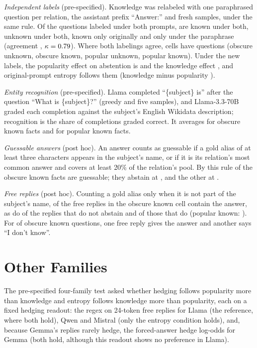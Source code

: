 \documentclass[manuscript,screen,review,anonymous,nonacm]{acmart}
\newcommand{\idk}{``I don't know''}
\begin{document}
\emph{Independent labels} (pre-specified). Knowledge was relabeled with one paraphrased question per relation, the assistant prefix ``Answer:'' and fresh samples, under the same rule. Of the \lcBothN{} questions labeled under both prompts, \lcKK{} are known under both, \lcUU{} unknown under both, \lcKU{} known only originally and \lcUK{} only under the paraphrase (agreement \lcAgree, $\kappa=0.79$). Where both labelings agree, cells have \lcConsN{} questions (obscure unknown, obscure known, popular unknown, popular known). Under the new labels, the popularity effect on abstention is \eoPop{} \eoPopCI{} and the knowledge effect \eoKnow{} \eoKnowCI, and original-prompt entropy follows them (knowledge minus popularity \eoEntKmP{} \eoEntKmPCI).

\emph{Entity recognition} (pre-specified). Llama completed ``\{subject\} is'' after the question ``What is \{subject\}?'' (greedy and five samples), and Llama-3.3-70B graded each completion against the subject's English Wikidata description; recognition is the share of completions graded correct. It averages \ekObsKnown{} for obscure known facts and \ekPopKnown{} for popular known facts.

\emph{Guessable answers} (post hoc). An answer counts as guessable if a gold alias of at least three characters appears in the subject's name, or if it is its relation's most common answer and covers at least 20\% of the relation's pool. By this rule \rcGuessN{} of the \gsObsKnownTotal{} obscure known facts are guessable; they abstain at \rcGuessAbs, and the other \rcNonGuessN{} at \rcNonGuessAbs.

\emph{Free replies} (post hoc). Counting a gold alias only when it is not part of the subject's name, \ecAll{} of the free replies in the obscure known cell contain the answer, as do \ecNonAbs{} of the replies that do not abstain and \ecAbs{} of those that do (popular known: \ecPopKnown). For \ecBoth{} of \ecBothOf{} obscure known questions, one free reply gives the answer and another says \idk.

\section{Other Families}
\label{app:families}

The pre-specified four-family test asked whether hedging follows popularity more than knowledge and entropy follows knowledge more than popularity, each on a fixed hedging readout: the regex on 24-token free replies for Llama (the reference, where both hold), Qwen and Mistral (only the entropy condition holds), and, because Gemma's replies rarely hedge, the forced-answer hedge log-odds for Gemma (both hold, although this readout shows no preference in Llama).
\end{document}
